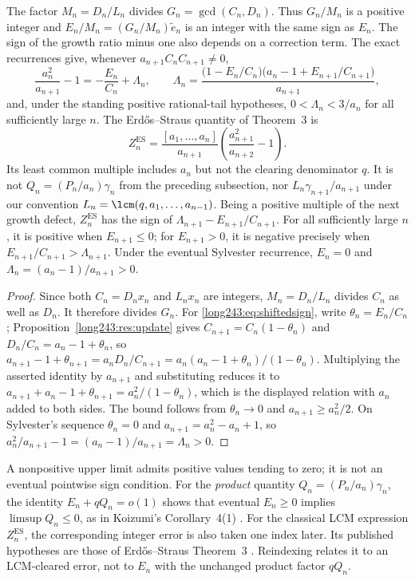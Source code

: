 \begin{proposition}\label{long243:res:classicalhalfspace}
The factor $M_n=D_n/L_n$ divides $G_n=\gcd(C_n,D_n)$. Thus $G_n/M_n$
is a positive integer and $E_n/M_n=(G_n/M_n)\tilde e_n$ is an integer
with the same sign as $E_n$. The sign of the growth ratio minus one also
depends on a correction term. The exact recurrences give, whenever
$a_{n+1}C_nC_{n+1}\ne0$,
\begin{equation}\label{long243:eq:shiftedsign}
 \frac{a_n^2}{a_{n+1}}-1=-\frac{E_n}{C_n}+\Lambda_n,
 \qquad
 \Lambda_n=\frac{\bigl(1-E_n/C_n\bigr)\bigl(a_n-1+E_{n+1}/C_{n+1}\bigr)}{a_{n+1}},
\end{equation}
and, under the standing positive rational-tail hypotheses,
$0<\Lambda_n<3/a_n$ for all sufficiently large $n$. The
Erd\H{o}s--Straus quantity of Theorem~3 is
\[
 Z_n^{\mathrm{ES}}=
 \frac{[a_1,\ldots,a_n]}{a_{n+1}}
 \left(\frac{a_{n+1}^2}{a_{n+2}}-1\right).
\]
Its least common multiple includes $a_n$ but not the clearing
denominator $q$. It is not $Q_n=(P_n/a_n)\gamma_n$ from the preceding subsection,
nor $L_n\gamma_{n+1}/a_{n+1}$ under our convention
$L_n=\lcm(q,a_1,\ldots,a_{n-1})$.
Being a positive multiple of the next growth defect, $Z_n^{\mathrm{ES}}$
has the sign of $\Lambda_{n+1}-E_{n+1}/C_{n+1}$. For all sufficiently
large $n$, it is positive when $E_{n+1}\le0$; for $E_{n+1}>0$, it is
negative precisely when
$E_{n+1}/C_{n+1}>\Lambda_{n+1}$. Under the eventual Sylvester recurrence, $E_n=0$ and
$\Lambda_n=(a_n-1)/a_{n+1}>0$.
\end{proposition}

\begin{proof}
Since both $C_n=D_nx_n$ and $L_nx_n$ are integers, $M_n=D_n/L_n$
divides $C_n$ as well as $D_n$. It therefore divides $G_n$.  For \eqref{long243:eq:shiftedsign}, write
$\theta_n=E_n/C_n$; Proposition~\ref{long243:res:update} gives $C_{n+1}=C_n(1-\theta_n)$
and $D_n/C_n=a_n-1+\theta_n$, so
$a_{n+1}-1+\theta_{n+1}=a_nD_n/C_{n+1}=a_n(a_n-1+\theta_n)/(1-\theta_n)$.
Multiplying the asserted identity by $a_{n+1}$ and substituting reduces it to
$a_{n+1}+a_n-1+\theta_{n+1}=a_n^2/(1-\theta_n)$, which is the displayed
relation with $a_n$ added to both sides.  The bound follows from
$\theta_n\to0$ and $a_{n+1}\ge a_n^2/2$.  On Sylvester's sequence
$\theta_n=0$ and $a_{n+1}=a_n^2-a_n+1$, so
$a_n^2/a_{n+1}-1=(a_n-1)/a_{n+1}=\Lambda_n>0$.
\end{proof}


A nonpositive upper limit admits positive values tending to zero; it is
not an eventual pointwise sign condition. For the \emph{product} quantity
$Q_n=(P_n/a_n)\gamma_n$, the identity $E_n+qQ_n=o(1)$ shows that eventual
$E_n\ge0$ implies $\limsup Q_n\le0$, as in Koizumi's Corollary~4(1)
\cite[pp.~14--15]{koizumi2025}.
For the classical LCM expression $Z_n^{\mathrm{ES}}$, the corresponding
integer error is also taken one index later. Its published hypotheses are
those of Erd\H{o}s--Straus Theorem~3
\cite[p.~132]{erdosstraus1964}. Reindexing relates it to an LCM-cleared
error, not to $E_n$ with the unchanged product factor $qQ_n$.


